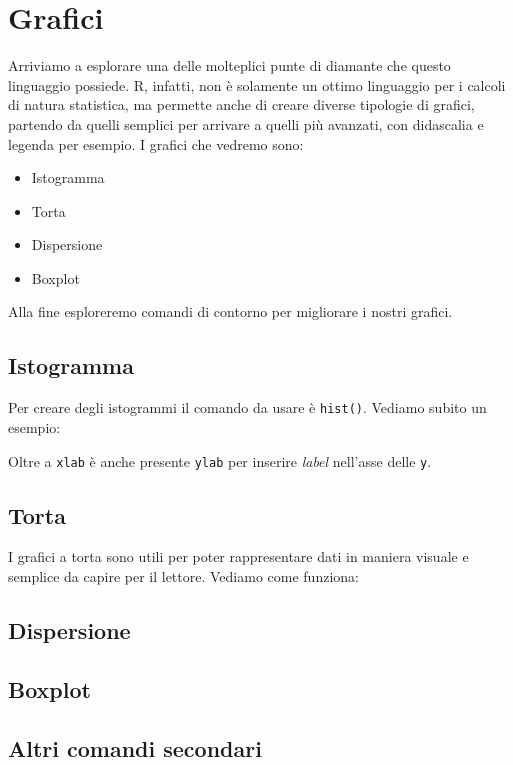\chapter{Grafici}

Arriviamo a esplorare una delle molteplici punte di diamante che questo
linguaggio possiede. R, infatti, non è solamente un ottimo linguaggio per i
calcoli di natura statistica, ma permette anche di creare diverse tipologie di
grafici, partendo da quelli semplici per arrivare a quelli più avanzati, con
didascalia e legenda per esempio.
I grafici che vedremo sono:
\begin{itemize}
 \item Istogramma
 \item Torta
 \item Dispersione
 \item Boxplot
\end{itemize}

Alla fine esploreremo comandi di contorno per migliorare i nostri grafici.

\section{Istogramma}

Per creare degli istogrammi il comando da usare è \texttt{hist()}. Vediamo
subito un esempio:



Oltre a \texttt{xlab} è anche presente \texttt{ylab} per inserire
\textit{label} nell'asse delle \texttt{y}.

\section{Torta}

I grafici a torta sono utili per poter rappresentare dati in maniera visuale e
semplice da capire per il lettore.
Vediamo come funziona:



\section{Dispersione}

\section{Boxplot}

\section{Altri comandi secondari}

